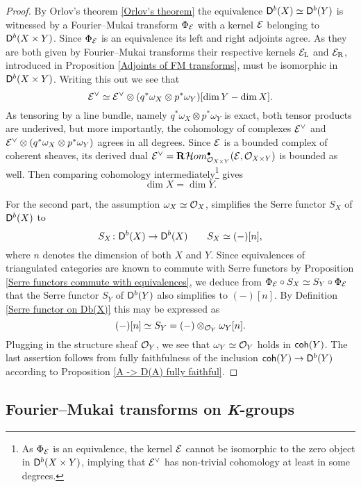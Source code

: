 \begin{proof}
    By Orlov's theorem \ref{Orlov's theorem} the equivalence $\mathsf{D}^b(X) \simeq \mathsf{D}^b(Y)$ is witnessed by a Fourier--Mukai transform $\Phi_{\mathcal E}$ with a kernel $\mathcal E$ belonging to $\mathsf{D}^b(X \times Y)$. Since $\Phi_{\mathcal E}$ is an equivalence its left and right adjoints agree. As they are both given by Fourier--Mukai transforms their respective kernels $\mathcal E_\mathrm{L}$ and $\mathcal E_\mathrm{R}$, introduced in Proposition \ref{Adjoints of FM transforms}, must be isomorphic in $\mathsf{D}^b(X \times Y)$. Writing this out we see that
    \[
        \mathcal E^\vee \simeq \mathcal E^\vee \otimes (q^*\omega_X \otimes p^*\omega_Y)[\dim Y - \dim X].
    \]
    As tensoring by a line bundle, namely $q^*\omega_X \otimes p^*\omega_Y$ is exact, both tensor products are underived, but more importantly, the cohomology of complexes $\mathcal E^\vee$ and ${\mathcal E^\vee \otimes (q^*\omega_X \otimes p^*\omega_Y)}$ agrees in all degrees. Since $\mathcal E$ is a bounded complex of coherent sheaves, its derived dual $\E^\vee = \rderived{}{\localhom[X \times Y]^\bullet(\E, \struct{X \times Y})}$ is bounded as well. Then comparing cohomology intermediately\footnote{As $\Phi_{\mathcal E}$ is an equivalence, the kernel $\mathcal E$ cannot be isomorphic to the zero object in $\mathsf{D}^b(X \times Y)$, implying that $\mathcal E^\vee$ has non-trivial cohomology at least in some degrees.} gives 
    \[
        \dim X = \dim Y.
    \]
    
    For the second part, the assumption $\omega_X \simeq {\mathcal{O}_{X}}$, simplifies the Serre functor $S_X$ of $\mathsf{D}^b(X)$ to 
    \[
        S_X \colon \mathsf{D}^b(X) \to \mathsf{D}^b(X) \qquad S_X \simeq (-)[n], 
    \]
    where $n$ denotes the dimension of both $X$ and $Y$. Since equivalences of triangulated categories are known to commute with Serre functors by Proposition \ref{Serre functors commute with equivalences}, we deduce from $\Phi_{\mathcal E} \circ S_X \simeq S_Y \circ \Phi_{\mathcal E}$ that the Serre functor $S_Y$ of $\mathsf{D}^b(Y)$ also simplifies to $(-)[n]$. By Definition \ref{Serre functor on Db(X)} this may be expressed as
    \[
        (-)[n] \simeq S_Y = (-) \otimes_{{\mathcal{O}_{Y}}} \omega_Y[n].
    \]
    Plugging in the structure sheaf ${\mathcal{O}_{Y}}$, we see that $\omega_Y \simeq {\mathcal{O}_{Y}}$ holds in $\mathsf{coh}(Y)$. The last assertion 
    follows from fully faithfulness of the inclusion $\mathsf{coh}(Y) \to \mathsf{D}^b(Y)$ according to Proposition \ref{A -> D(A) fully faithful}. 
\end{proof}

\subsection{Fourier--Mukai transforms on \emph{K}-groups}
\label{Subsection: FM transform on K-theory}


